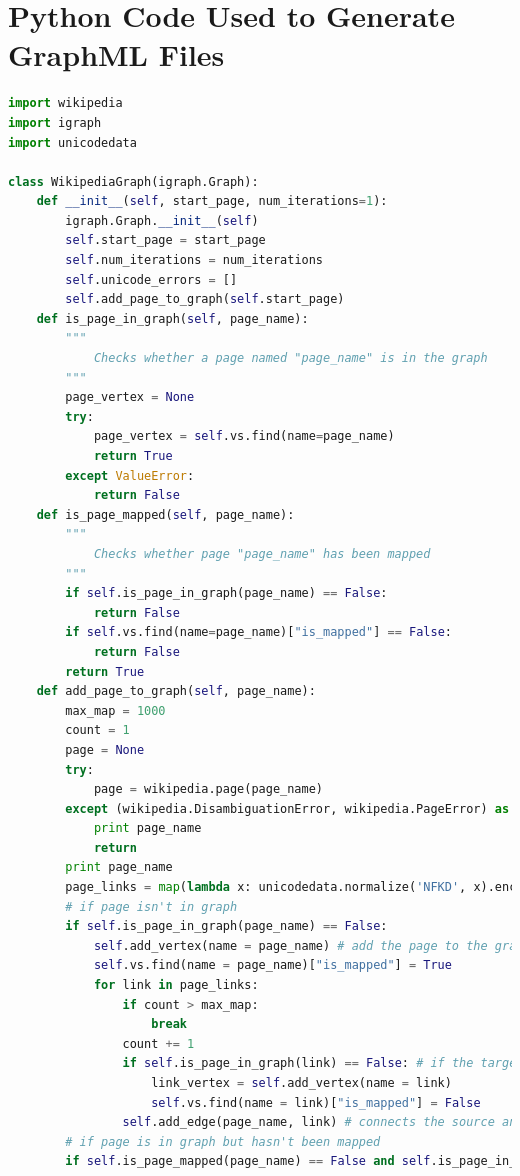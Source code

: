 \documentclass[man, 12pt, floatsintext, donotrepeattitle]{apa6}
\begin{document}
\section{Python Code Used to Generate GraphML Files}
\begin{lstlisting}[language=Python, caption=Complete Python Implementation of
  the Mapping Algorithm]
import wikipedia
import igraph
import unicodedata

class WikipediaGraph(igraph.Graph):
    def __init__(self, start_page, num_iterations=1):
        igraph.Graph.__init__(self)
        self.start_page = start_page
        self.num_iterations = num_iterations
        self.unicode_errors = []
        self.add_page_to_graph(self.start_page)
    def is_page_in_graph(self, page_name):
        """
            Checks whether a page named "page_name" is in the graph
        """
        page_vertex = None
        try:
            page_vertex = self.vs.find(name=page_name)
            return True
        except ValueError:
            return False
    def is_page_mapped(self, page_name):
        """
            Checks whether page "page_name" has been mapped
        """
        if self.is_page_in_graph(page_name) == False:
            return False
        if self.vs.find(name=page_name)["is_mapped"] == False:
            return False
        return True
    def add_page_to_graph(self, page_name):
        max_map = 1000
        count = 1
        page = None
        try:
            page = wikipedia.page(page_name)
        except (wikipedia.DisambiguationError, wikipedia.PageError) as e:
            print page_name
            return
        print page_name
        page_links = map(lambda x: unicodedata.normalize('NFKD', x).encode('ascii','ignore'), page.links)
        # if page isn't in graph
        if self.is_page_in_graph(page_name) == False:
            self.add_vertex(name = page_name) # add the page to the graph
            self.vs.find(name = page_name)["is_mapped"] = True
            for link in page_links:
                if count > max_map:
                    break
                count += 1
                if self.is_page_in_graph(link) == False: # if the target page isn't already in the graph
                    link_vertex = self.add_vertex(name = link)
                    self.vs.find(name = link)["is_mapped"] = False
                self.add_edge(page_name, link) # connects the source and target pages
        # if page is in graph but hasn't been mapped
        if self.is_page_mapped(page_name) == False and self.is_page_in_graph(page_name) == True:

\end{lstlisting}
\end{document}
